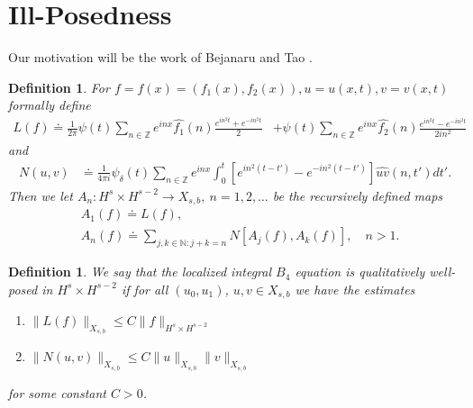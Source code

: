 \documentclass[12pt,reqno]{amsart}
\numberwithin{equation}{section}  %
\newcommand{\zz}{\mathbb{Z}}
\newcommand{\wh}{\widehat}
\newtheorem{definition}[theorem]{Definition}
\begin{document}
\section{Ill-Posedness}
Our motivation will be the work of Bejanaru and Tao
\cite{Bejenaru-Tao-2006-Sharp-well-posedness-and-ill-posedness}. 
%
\begin{definition}
  For $f =f(x)= (f_{1}(x), f_{2}(x)), u = u(x,t), v = v(x,t)$ formally define 
%
%
\begin{equation*}
\begin{split}
  L(f)
  \doteq \frac{1}{2 \pi} \psi(t) \sum_{n \in \zz} e^{inx}
  \wh{f_{1}}(n) \frac{e^{in^{2}t} + e^{-in^{2}t}}{2} 
  & + \psi(t) \sum_{n \in \zz} e^{inx}
  \wh{f_{2}}(n)\frac{e^{in^{2}t} - e^{-in^{2}t}}{2 i n^{2}} 
\end{split}
\end{equation*}
%
%
and
%
%
\begin{equation*}
\begin{split}
N(u, v)
& \doteq \frac{1}{4 \pi i} \psi_{\delta}(t) \sum_{n \in \zz} e^{inx}
    \int_{0}^{t}[e^{in^{2}(t-t')}-e^{-in^{2}(t-t')}]
    \wh{uv}(n, t') dt'.
\end{split}
\end{equation*}
%
%
Then we let $A_{n}: H^{s} \times H^{s-2} \to X_{s,b}, \ n = 1, 2, \dots$ be the
recursively defined maps
%
%
\begin{equation*}
\begin{split}
  & A_{1}(f) \doteq L(f),
  \\
  & A_{n}(f) \doteq \sum_{j, k \in \mathbb{N}: j + k = n} N\left[
  A_{j}(f), A_{k}(f) \right], \quad n > 1.
\end{split}
\end{equation*}

\end{definition}
%
%
\begin{definition}
  We say that the localized integral $B_{4}$ equation
  is \emph{qualitatively well-posed} in $H^{s} \times H^{s-2}$
  if for all $(u_{0}, u_{1})$, $u, v
  \in X_{s,b}$ we have the estimates
  \begin{enumerate}
    \item{$\|L(f)\|_{X_{s,b}} \le C \| f \|_{H^{s} \times
      H^{s-2}}$}
    \item{$\| N(u, v) \|_{X_{s,b}} \le C \| u \|_{X_{s,b}} \| v \|_{X_{s,b}}$} 
  \end{enumerate}
  for some constant $C > 0$.
\end{definition}
%
\end{document}
